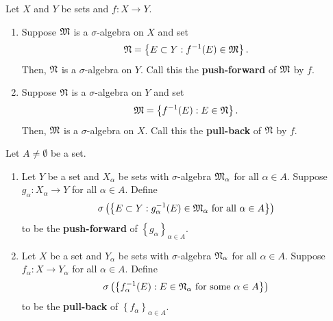 \documentclass[a4paper]{article}
\begin{document}
\begin{thm}
  Let $X$ and $Y$ be sets and $f: X \to Y$.
  \begin{enumerate}
    \item Suppose $\mathfrak{M}$ is a $\sigma$-algebra on $X$ and set
          \[
            \mathfrak{N} = \left\{ E \subset Y:
            f^{-1}(E) \in \mathfrak{M} \right\}.
          \]
          Then, $\mathfrak{N}$ is a $\sigma$-algebra on $Y$. Call this the
          \textbf{push-forward} of $\mathfrak{M}$ by $f$.

    \item Suppose $\mathfrak{N}$ is a $\sigma$-algebra on $Y$ and set
          \[
            \mathfrak{M} = \left\{ f^{-1}(E) : E \in \mathfrak{N} \right\}.
          \]
          Then, $\mathfrak{M}$ is a $\sigma$-algebra on $X$. Call this the
          \textbf{pull-back} of $\mathfrak{N}$ by $f$.
  \end{enumerate}
\end{thm}

\begin{defi}
  Let $A \neq \emptyset$ be a set.
  \begin{enumerate}
    \item Let $Y$ be a set and $X_\alpha$ be sets with $\sigma$-algebra
          $\mathfrak{M}_\alpha$ for all $\alpha \in A$. Suppose $g_\alpha :
          X_\alpha \to Y$ for all $\alpha \in A$. Define
          \[
            \sigma \left( \left\{ E \subset Y: g_\alpha^{-1}(E)
            \in \mathfrak{M}_\alpha \text{ for all $\alpha \in A$}
            \right\} \right)
          \]
          to be the \textbf{push-forward} of $\left\{ g_\alpha
          \right\}_{\alpha \in A}$.

    \item Let $X$ be a set and $Y_\alpha$ be sets with $\sigma$-algebra
          $\mathfrak{N}_\alpha$ for all $\alpha \in A$. Suppose $f_\alpha : X \to
          Y_\alpha$ for all $\alpha \in A$. Define
          \[
            \sigma \left( \left\{ f_\alpha^{-1}(E) :
            E \in \mathfrak{N}_\alpha \text{ for some $\alpha \in A$}
            \right\} \right)
          \]
          to be the \textbf{pull-back} of $\left\{ f_\alpha
          \right\}_{\alpha \in A}$.
  \end{enumerate}
\end{defi}
\end{document}
